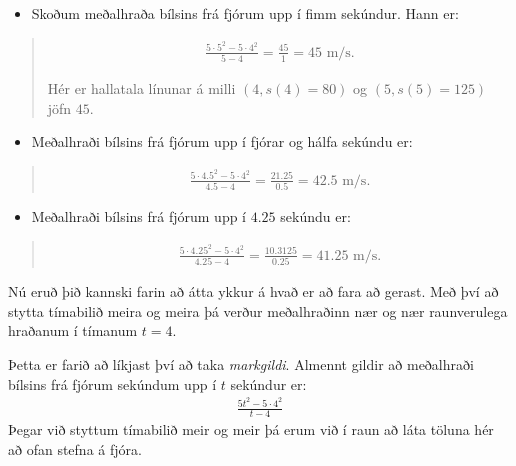 \documentclass[a4paper,10pt,icelandic]{sphinxmanual}
\begin{document}
\begin{itemize}
\item {} 
Skoðum meðalhraða bílsins frá fjórum upp í fimm sekúndur. Hann er:

\end{itemize}
\begin{quote}
\begin{equation*}
\begin{split}\frac{5 \cdot 5^2 - 5 \cdot 4^2}{5 -4} = \frac{45}{1} = 45 \text{ m/s}.\end{split}
\end{equation*}

Hér er hallatala línunar á milli \((4, s(4) = 80)\) og \((5, s(5) = 125)\) jöfn \(45\).
\end{quote}
\begin{itemize}
\item {} 
Meðalhraði bílsins frá fjórum upp í fjórar og hálfa sekúndu er:

\end{itemize}
\begin{quote}
\begin{equation*}
\begin{split}\frac{5 \cdot4.5^2 - 5 \cdot 4^2}{ 4.5-4} = \frac{21.25}{0.5} = 42.5 \text{ m/s}.\end{split}
\end{equation*}\end{quote}
\begin{itemize}
\item {} 
Meðalhraði bílsins frá fjórum upp í \(4.25\) sekúndu er:

\end{itemize}
\begin{quote}
\begin{equation*}
\begin{split}\frac{5 \cdot4.25^2 - 5 \cdot 4^2}{ 4.25-4} = \frac{10.3125}{0.25} = 41.25 \text{ m/s}.\end{split}
\end{equation*}\end{quote}

Nú eruð þið kannski farin að átta ykkur á hvað er að fara að gerast.
Með því að stytta tímabilið meira og meira þá verður meðalhraðinn nær og nær raunverulega hraðanum í tímanum \(t = 4\).

Þetta er farið að líkjast því að taka \textit{markgildi}.
Almennt gildir að meðalhraði bílsins frá fjórum sekúndum upp í \(t\) sekúndur er:
\begin{equation*}
\begin{split}\frac{5t^2−5 \cdot 4^2}{ t−4}\end{split}
\end{equation*}
Þegar við styttum tímabilið meir og meir þá erum við í raun að láta töluna hér að ofan stefna á fjóra.
\end{document}
